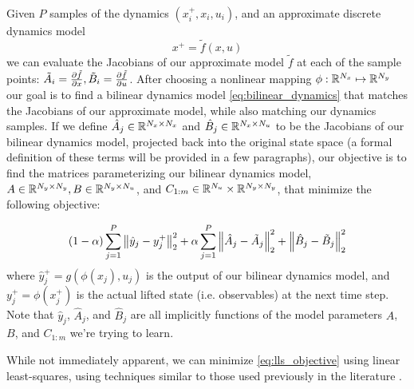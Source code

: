 \documentclass{article}
\begin{document}
  Given $P$ samples of the dynamics $(x_i^+, x_i, u_i)$, and an approximate discrete
  dynamics model 
  \begin{equation}
      x^+ = \tilde{f}(x,u)
  \end{equation}
  we can evaluate the Jacobians of our approximate model $\tilde{f}$ at each of the sample
  points: $\tilde{A}_i = \pdv{\tilde{f}}{x}, \tilde{B}_i = \pdv{\tilde{f}}{u}$. After
  choosing a nonlinear mapping $\phi : \mathbb{R}^{N_x} \mapsto \mathbb{R}^{N_y}$ our goal is to find a
  bilinear dynamics model \eqref{eq:bilinear_dynamics} that matches the Jacobians of our
  approximate model, while also matching our dynamics samples. If we define $\hat{A}_j \in
  \mathbb{R}^{N_x \times N_x}$ and $\hat{B}_j \in \mathbb{R}^{N_x \times N_u}$ to be the Jacobians of our
  bilinear dynamics model, projected back into the original state space (a formal definition
  of these terms will be provided in a few paragraphs), our objective is to find the
  matrices parameterizing our bilinear dynamics model, $A \in \mathbb{R}^{N_y \times N_y},B \in
  \mathbb{R}^{N_y \times N_u}$, and $C_{1:m} \in \mathbb{R}^{N_u} \times \mathbb{R}^{N_y \times N_y}$, that minimize
  the following objective:

  \begin{equation} \label{eq:lls_objective}
      (1- \alpha) \sum_{j=1}^P \norm{\hat{y}_j - y_j^+}_2^2 + 
          \alpha  \sum_{j=1}^P \norm{\hat{A}_j - \tilde{A}_j}_2^2 + 
                               \norm{\hat{B}_j - \tilde{B}_j}_2^2 
  \end{equation}
  where $\hat{y}_j^+ = g\left(\phi(x_j), u_j\right)$ is the output of our bilinear dynamics
  model, and $y_j^+ = \phi(x_j^+)$ is the actual lifted state (i.e. observables) at the next
  time step. Note that $\hat{y}_j$, $\hat{A}_j$, and $\hat{B}_j$ are all implicitly
  functions of the model parameters $A$, $B$, and $C_{1:m}$ we're trying to learn.

  While not immediately apparent, we can minimize \eqref{eq:lls_objective} using linear
  least-squares, using techniques similar to those used previously in the literature
  \cite{Folkestad2021}.
\end{document}
